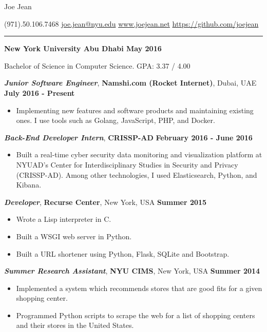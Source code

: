 \documentclass[11pt]{article} %
\begin{document}
\centerline{{\Huge \sc Joe Jean}}  %
\centerline{(971).50.106.7468 \textbar \hspace{2pt}\href{mailto:joe.jean@nyu.edu}{joe.jean@nyu.edu} \textbar \hspace{2pt}\url{www.joejean.net} \textbar \hspace{2pt}\url{https://github.com/joejean} } 
\noindent
\rule{\textwidth}{1pt}\bigskip

\medskip

\noindent \centerline{\normalsize \bf New York University Abu Dhabi \hfill \textbf{May 2016}}
Bachelor of Science in Computer Science. GPA: 3.37 / 4.00\\

 \medskip

\noindent \centerline {\textbf{\textit{Junior Software Engineer}},\textbf { Namshi.com (Rocket Internet)}, Dubai, UAE \hfill \textbf{July 2016 - Present}}
\begin{itemize}\itemsep-0.1em
  \item Implementing new features and software products and maintaining existing ones. I use tools such as Golang, JavaScript, PHP, and Docker.
\end{itemize}
\noindent \centerline {\textbf{\textit{Back-End Developer Intern}},\textbf { CRISSP-AD} \hfill \textbf{February 2016 - June 2016}}
\begin{itemize}\itemsep-0.1em
  \item Built a real-time cyber security data monitoring and visualization platform at NYUAD's Center for Interdisciplinary Studies in Security and Privacy (CRISSP-AD). Among other technologies, I used Elasticsearch, Python, and Kibana. 
\end{itemize}
\noindent \centerline{\large \textbf{\textit{Developer}}, \textbf {Recurse Center}, New York, USA \hfill \textbf{Summer 2015}}
\begin{itemize}\itemsep-0.4em
  \item Wrote a Lisp interpreter in C. 
  \item Built a WSGI web server in Python.
  \item Built a URL shortener using Python, Flask, SQLite and Bootstrap.
\end{itemize}
\noindent \centerline{\large \textbf{\textit{Summer Research Assistant}}, \textbf {NYU CIMS}, New York, USA \hfill \textbf{Summer 2014}}
\begin{itemize}\itemsep-0.2em
  \item Implemented a system which recommends stores that are good fits for a given shopping center.
  \item Programmed Python scripts to scrape the web for a list of shopping centers and their stores in the United States.
\end{itemize}
\medskip
\end{document}
